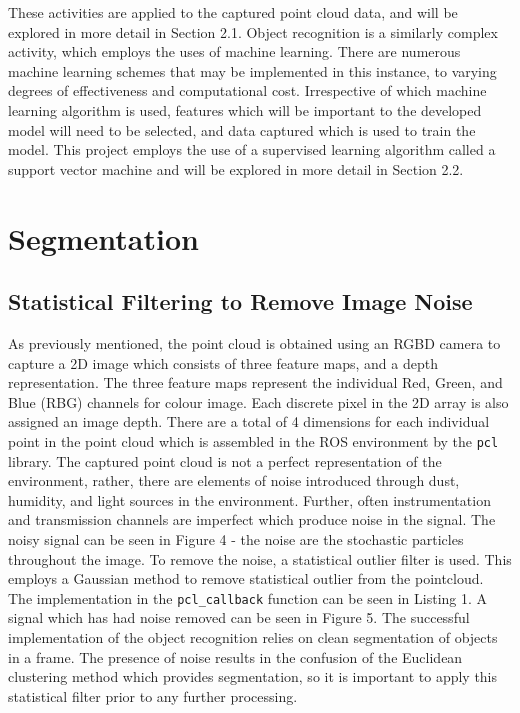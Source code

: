 \documentclass[a4paper]{article}
\begin{document}
These activities are applied to the captured point cloud data, and will be explored in more detail in Section 2.1. Object recognition is a similarly complex activity, which employs the uses of machine learning. There are numerous machine learning schemes that may be implemented in this instance, to varying degrees of effectiveness and computational cost. Irrespective of which machine learning algorithm is used, features which will be important to the developed model will need to be selected, and data captured which is used to train the model. This project employs the use of a supervised learning algorithm called a support vector machine and will be explored in more detail in Section 2.2.

\newpage


\section{Segmentation}
\subsection{Statistical Filtering to Remove Image Noise}
As previously mentioned, the point cloud is obtained using an RGBD camera to capture a 2D image which consists of three feature maps, and a depth representation. The three feature maps represent the individual Red, Green, and Blue (RBG) channels for colour image. Each discrete pixel in the 2D array is also assigned an image depth. There are a total of 4 dimensions for each individual point in the point cloud which is assembled in the ROS environment by the \verb|pcl| library. The captured point cloud is not a perfect representation of the environment, rather, there are elements of noise introduced through dust, humidity, and light sources in the environment. Further, often instrumentation and transmission channels are imperfect which produce noise in the signal. The noisy signal can be seen in Figure 4 - the noise are the stochastic particles throughout the image. To remove the noise, a statistical outlier filter is used. This employs a Gaussian method to remove statistical outlier from the pointcloud. The implementation in the \verb|pcl_callback| function can be seen in Listing 1. A signal which has had noise removed can be seen in Figure 5. The successful implementation of the object recognition relies on clean segmentation of objects in a frame. The presence of noise results in the confusion of the Euclidean clustering method which provides segmentation, so it is important to apply this statistical filter prior to any further processing.
\end{document}
